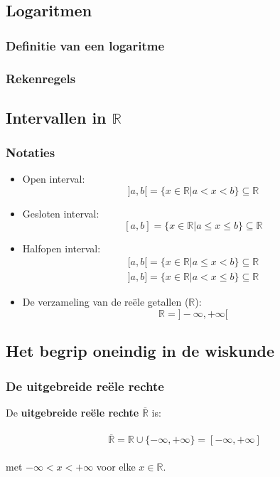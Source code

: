 \subsection{Logaritmen}
\begin{frame}
\frametitle{Definitie van een logaritme}
\pause
\begin{definitie}

\end{definitie}
\end{frame}

\begin{frame}
\frametitle{Rekenregels}
\pause
\begin{eigenschap}

\end{eigenschap}
\end{frame}

\subsection{Intervallen in $\mathbb{R}$}
\begin{frame}
\frametitle{Notaties}
\pause
\begin{itemize}
\item<+-> Open interval:
      \[ ]a,b[=\{x\in \mathbb{R} | a<x<b\} \subseteq \mathbb{R} \]
\item<+-> Gesloten interval:
      \[ [a,b]=\{x\in \mathbb{R} | a\leq x \leq b\} \subseteq \mathbb{R} \]
\item<+-> Halfopen interval:
      \[ \begin{array}{l}
         [a,b[=\{x\in \mathbb{R} | a \leq x<b\} \subseteq \mathbb{R} \\
         ]a,b]=\{x\in \mathbb{R} | a < x \leq b\} \subseteq \mathbb{R} 
         \end{array}\]
\item<+-> De verzameling van de re\"ele getallen ($\mathbb{R}$):
      \[ \mathbb{R} = ]-\infty,+\infty[ \]
\end{itemize}
\end{frame}


\subsection{Het begrip oneindig in de wiskunde}
\begin{frame}
\frametitle{De uitgebreide re\"ele rechte}
\pause
\begin{definitie}
De {\bf uitgebreide re\"ele rechte} $\overline{\mathbb{R}}$ is:\\~\\
\[ \overline{\mathbb{R}} = \mathbb{R} \cup  \{-\infty,+\infty\} = [-\infty,+\infty] \]~\\
met $-\infty < x < +\infty$ voor elke $x \in \mathbb{R}$.
\end{definitie}
\end{frame}


